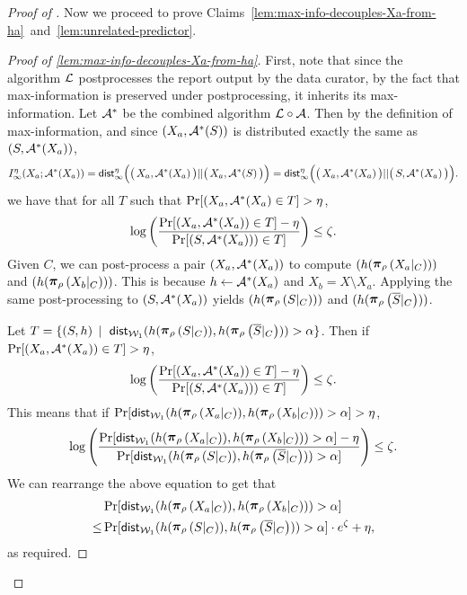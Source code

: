 \begin{proof}[Proof of ]
Now we proceed to prove Claims~\ref{lem:max-info-decouples-Xa-from-ha}~and~\ref{lem:unrelated-predictor}.

\begin{proof}[Proof of \cref{lem:max-info-decouples-Xa-from-ha}]
    First, note that since the algorithm $\mathcal{L}$ postprocesses the report output by the data curator, by the fact that max-information is preserved under postprocessing, it inherits its max-information. Let $\mathcal{A}^*$ be the combined algorithm $\mathcal{L} \circ \mathcal{A}$. Then by the definition of max-information, and since $(X_a,\mathcal{A}^*(S))$ is distributed exactly the same as $(S,\mathcal{A}^*(X_a))$,
    \ifnum{}
    $$I_\infty^\eta(X_a;\mathcal{A}^*(X_a)) = \mathsf{dist}_\infty^\eta\Big( \big(\,X_a,\mathcal{A}^*(X_a)\,\big) || \big(\,X_a,\mathcal{A}^*(S)\,\big)\Big) = \mathsf{dist}_\infty^\eta\Big( \big(\,X_a,\mathcal{A}^*(X_a)\,\big) || \big(\,S,\mathcal{A}^*(X_a)\,\big)\Big).$$
    \fi
    we have that for all $T$ such that $\Pr[(X_a,\mathcal{A}^*(X_a)\in T] > \eta$,
    $$\log\left(\frac{\Pr[(X_a,\mathcal{A}^*(X_a)) \in T]-\eta}{\Pr[(S,\mathcal{A}^*(X_a))) \in T]}\right)\leq \zeta.$$
   Given $C$, we can post-process a pair $(X_a,\mathcal{A}^*(X_a))$ to compute $(h(\restrict{X_a\lvert_C}{\selection}))$ and $(h(\restrict{X_b\lvert_C}{\selection}))$. This is because $h \leftarrow \mathcal{A}^*(X_a)$ and $X_b = X\setminus X_a$. Applying the same post-processing to $(S,\mathcal{A}^*(X_a))$ yields $(h(\restrict{S\lvert_C}{\selection}))$ and $(h(\restrict{\overline{S}\lvert_C}{\selection}))$.
    
    \medskip\noindent
    Let $T = \{ (S,h) \,\mid\,\, \wdist(h(\restrict{S\lvert_C}{\selection}), h(\restrict{\overline{S}\lvert_C}{\selection})) > \alpha \}$.%
    Then if $\Pr[(X_a,\mathcal{A}^*(X_a))\in T] > \eta$,%
    $$\log\left(\frac{\Pr[(X_a,\mathcal{A}^*(X_a)) \in T]-\eta}{\Pr[(S,\mathcal{A}^*(X_a))) \in T]}\right) \leq \zeta.$$
   This means that if $\Pr[\wdist(h(\restrict{X_a\lvert_C}{\selection}), h(\restrict{X_b\lvert_C}{\selection})) > \alpha] > \eta$,
    \[
    \log\left(\frac{\Pr[\wdist(h(\restrict{X_a\lvert_C}{\selection}), h(\restrict{X_b\lvert_C}{\selection})) > \alpha] - \eta}{\Pr[\wdist(h(\restrict{S\lvert_C}{\selection}), h(\restrict{\overline{S}\lvert_C}{\selection})) > \alpha]}\right) \leq \zeta.
    \]
% 
We can rearrange the above equation to get that 
\begin{align*}
    &\Pr[\wdist(h(\restrict{X_a\lvert_C}{\selection}), h(\restrict{X_b\lvert_C}{\selection})) > \alpha]\\
    \leq 
    &\Pr[\wdist(h(\restrict{S\lvert_C}{\selection}), h(\restrict{\overline{S}\lvert_C}{\selection})) > \alpha]\cdot e^{\zeta} + \eta,
\end{align*}
as required.
\end{proof}


\end{proof}
